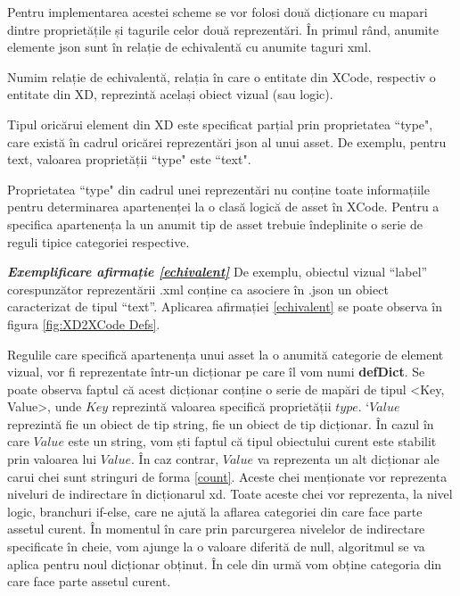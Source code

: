 Pentru implementarea acestei scheme se vor folosi două dicționare cu mapari dintre proprietățile și tagurile celor două reprezentări. 
În primul rând, anumite elemente json sunt în relație de echivalentă cu anumite taguri xml. 
\\

\begin{mydef}\label{echivalent}
Numim relație de echivalentă, relația în care o entitate din XCode, respectiv o entitate din XD, reprezintă același obiect vizual (sau logic).\\
\end{mydef}

\begin{myNote}\label{tip}
Tipul oricărui element din XD este specificat parțial prin proprietatea ``type", care există în cadrul oricărei reprezentări json al unui asset. De exemplu, pentru text, valoarea proprietății ``type" este ``text".\\
\end{myNote}

\begin{myNote}\label{echivalent}
Proprietatea ``type" din cadrul unei reprezentări nu conține toate informațiile pentru determinarea apartenenței la o clasă logică de asset în XCode. Pentru a specifica apartenența la un anumit tip de asset trebuie îndeplinite o serie de reguli tipice categoriei respective.\\
\end{myNote}

\textbf{\textit{Exemplificare afirmație \ref{echivalent}}} De exemplu, obiectul vizual “label” corespunzător reprezentării .xml conține ca asociere în .json un obiect caracterizat de tipul “text”. Aplicarea afirmației \ref{echivalent} se poate observa în figura \ref{fig:XD2XCode Defs}. 

Regulile care specifică apartenența unui asset la o anumită categorie de element vizual, vor fi reprezentate într-un dicționar pe care îl vom numi \textbf{defDict}. Se poate observa faptul că acest dicționar conține o serie de mapări de tipul <Key, Value>, unde $Key$ reprezintă valoarea specifică proprietății $type$. `$Value$ reprezintă fie un obiect de tip string, fie un obiect de tip dicționar. În cazul în care $Value$ este un string, vom ști faptul că tipul obiectului curent este stabilit prin valoarea lui $Value$. În caz contrar, $Value$ va reprezenta un alt dicționar ale carui chei sunt stringuri de forma \ref{count}. Aceste chei menționate vor reprezenta niveluri de indirectare în dicționarul xd. Toate aceste chei vor reprezenta, la nivel logic, branchuri if-else, care ne ajută la aflarea categoriei din care face parte assetul curent. În momentul în care prin parcurgerea nivelelor de indirectare specificate în cheie, vom ajunge la o valoare diferită de null, algoritmul se va aplica pentru noul dicționar obținut. În cele din urmă vom obține categoria din care face parte assetul curent. 

